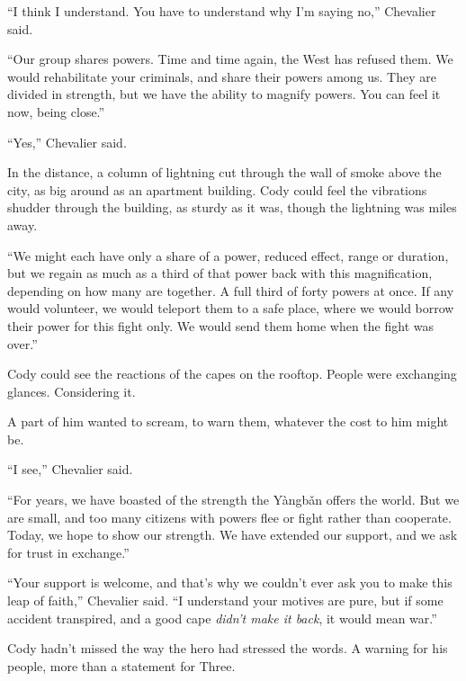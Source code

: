 ``I think I understand.  You have to understand why I'm saying no,'' Chevalier said.



``Our group shares powers.  Time and time again, the West has refused them.  We would rehabilitate your criminals, and share their powers among us.  They are divided in strength, but we have the ability to magnify powers.  You can feel it now, being close.''



``Yes,'' Chevalier said.



In the distance, a column of lightning cut through the wall of smoke above the city, as big around as an apartment building.  Cody could feel the vibrations shudder through the building, as sturdy as it was, though the lightning was miles away.



``We might each have only a share of a power, reduced effect, range or duration, but we regain as much as a third of that power back with this magnification, depending on how many are together.  A full third of forty powers at once.  If any would volunteer, we would teleport them to a safe place, where we would borrow their power for this fight only.  We would send them home when the fight was over.''



Cody could see the reactions of the capes on the rooftop.  People were exchanging glances.  Considering it.



A part of him wanted to scream, to warn them, whatever the cost to him might be.



``I see,'' Chevalier said.



``For years, we have boasted of the strength the Y\`{a}ngb\v{a}n offers the world.  But we are small, and too many citizens with powers flee or fight rather than cooperate.  Today, we hope to show our strength.  We have extended our support, and we ask for trust in exchange.''



``Your support is welcome, and that's why we couldn't ever ask you to make this leap of faith,'' Chevalier said.  ``I understand your motives are pure, but if some accident transpired, and a good cape \emph{didn't make it back}, it would mean war.''



Cody hadn't missed the way the hero had stressed the words.  A warning for his people, more than a statement for Three.



